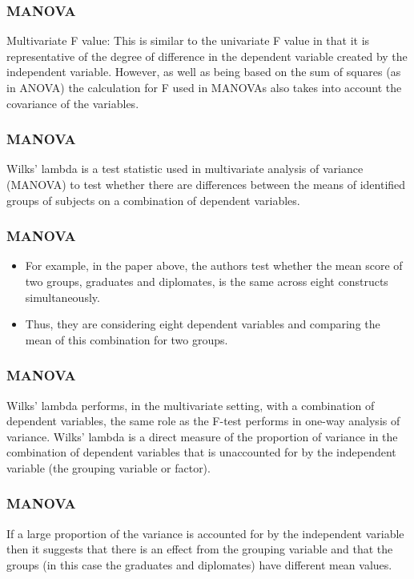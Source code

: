 \documentclass{beamer}
\begin{document}
	\begin{frame}
		\frametitle{MANOVA}
		Multivariate F value: This is similar to the univariate F value in that it is representative of
		the degree of difference in the dependent variable created by the independent variable.
		However, as well as being based on the sum of squares (as in ANOVA) the calculation
		for F used in MANOVAs also takes into account the covariance of the variables. 
		\end{frame}
		
		\begin{frame}
			\frametitle{MANOVA}	
			Wilks' lambda is a test statistic used in multivariate analysis of variance
			(MANOVA) to test whether there are differences between the means of
			identified groups of subjects on a combination of dependent variables. 
			
		\end{frame}

		\begin{frame}
			\frametitle{MANOVA}
			
			\begin{itemize}
				\item For
				example, in the paper above, the authors test whether the mean score of two
				groups, graduates and diplomates, is the same across eight constructs
				simultaneously. 
				\item Thus, they are considering eight dependent variables and
				comparing the mean of this combination for two groups.
			\end{itemize}
		\end{frame}
		\begin{frame}
			\frametitle{MANOVA}
			Wilks' lambda performs, in the multivariate setting, with a combination of
			dependent variables, the same role as the F-test performs in one-way analysis
			of variance. Wilks' lambda is a direct measure of the proportion of variance in
			the combination of dependent variables that is unaccounted for by the
			independent variable (the grouping variable or factor). 
		\end{frame}
		\begin{frame}
			\frametitle{MANOVA}
			If a large proportion
			of the variance is accounted for by the independent variable then it suggests
			that there is an effect from the grouping variable and that the groups (in this
			case the graduates and diplomates) have different mean values.
		\end{frame}
\end{document}

